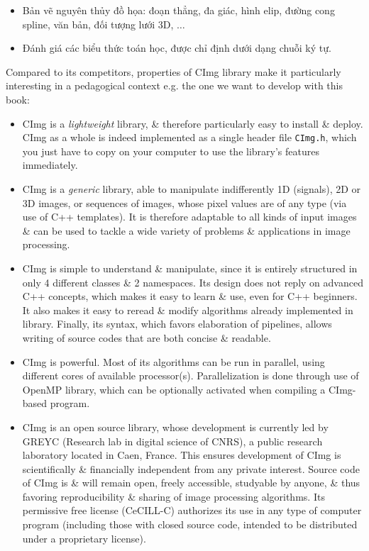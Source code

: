 \documentclass{article}
\begin{document}
\begin{itemize}
\begin{itemize}
\begin{itemize}
            \item Bản vẽ nguyên thủy đồ họa: đoạn thẳng, đa giác, hình elip, đường cong spline, văn bản, đối tượng lưới 3D, $\ldots$
            \item Đánh giá các biểu thức toán học, được chỉ định dưới dạng chuỗi ký tự.
        \end{itemize}
        Compared to its competitors, properties of CImg library make it particularly interesting in a pedagogical context e.g. the one we want to develop with this book:
        \begin{itemize}
            \item CImg is a {\it lightweight} library, \& therefore particularly easy to install \& deploy. CImg as a whole is indeed implemented as a single header file {\tt CImg.h}, which you just have to copy on your computer to use the library's features immediately.
            \item CImg is a {\it generic} library, able to manipulate indifferently 1D (signals), 2D or 3D images, or sequences of images, whose pixel values are of any type (via use of C++ templates). It is therefore adaptable to all kinds of input images \& can be used to tackle a wide variety of problems \& applications in image processing.
            \item CImg is simple to understand \& manipulate, since it is entirely structured in only 4 different classes \& 2 namespaces. Its design does not reply on advanced C++ concepts, which makes it easy to learn \& use, even for C++ beginners. It also makes it easy to reread \& modify algorithms already implemented in library. Finally, its syntax, which favors elaboration of pipelines, allows writing of source codes that are both concise \& readable.
            \item CImg is powerful. Most of its algorithms can be run in parallel, using different cores of available processor(s). Parallelization is done through use of OpenMP library, which can be optionally activated when compiling a CImg-based program.
            \item CImg is an open source library, whose development is currently led by GREYC (Research lab in digital science of CNRS), a public research laboratory located in Caen, France. This ensures development of CImg is scientifically \& financially independent from any private interest. Source code of CImg is \& will remain open, freely accessible, studyable by anyone, \& thus favoring reproducibility \& sharing of image processing algorithms. Its permissive free license (CeCILL-C) authorizes its use in any type of computer program (including those with closed source code, intended to be distributed under a proprietary license).

\end{itemize}
\end{itemize}
\end{itemize}
\end{document}
